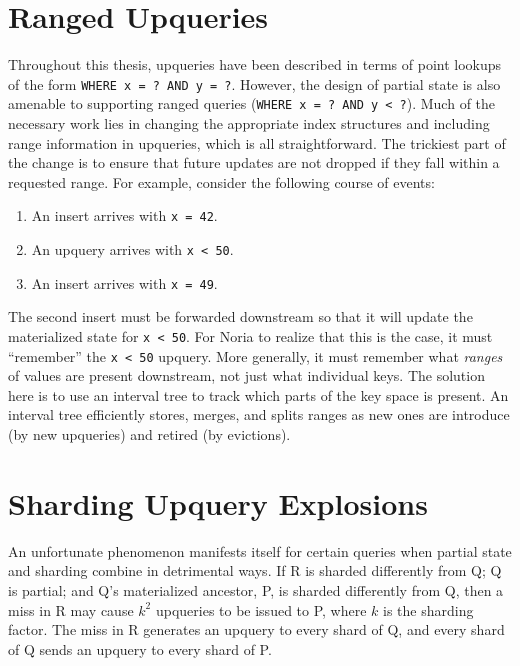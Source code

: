 \section{Ranged Upqueries}
\label{s:disc:ranged}

Throughout this thesis, upqueries have been described in terms of point lookups
of the form \texttt{WHERE x = ? AND y = ?}. However, the design of partial state
is also amenable to supporting ranged queries (\texttt{WHERE x = ? AND y < ?}).
Much of the necessary work lies in changing the appropriate index structures and
including range information in upqueries, which is all straightforward. The
trickiest part of the change is to ensure that future updates are not dropped if
they fall within a requested range. For example, consider the following course
of events:

\begin{enumerate}
  \item An insert arrives with \texttt{x = 42}.
  \item An upquery arrives with \texttt{x < 50}.
  \item An insert arrives with \texttt{x = 49}.
\end{enumerate}

The second insert must be forwarded downstream so that it will update the
materialized state for \texttt{x < 50}. For Noria to realize that this is the
case, it must ``remember'' the \texttt{x < 50} upquery. More generally, it must
remember what \emph{ranges} of values are present downstream, not just what
individual keys. The solution here is to use an interval tree to track which
parts of the key space is present. An interval tree efficiently stores, merges,
and splits ranges as new ones are introduce (by new upqueries) and retired (by
evictions).

\section{Sharding Upquery Explosions}

An unfortunate phenomenon manifests itself for certain queries when partial
state and sharding combine in detrimental ways. If R is sharded differently from
Q; Q is partial; and Q's materialized ancestor, P, is sharded differently from
Q, then a miss in R may cause $k^2$ upqueries to be issued to P, where $k$ is
the sharding factor. The miss in R generates an upquery to every shard of Q, and
every shard of Q sends an upquery to every shard of P.

